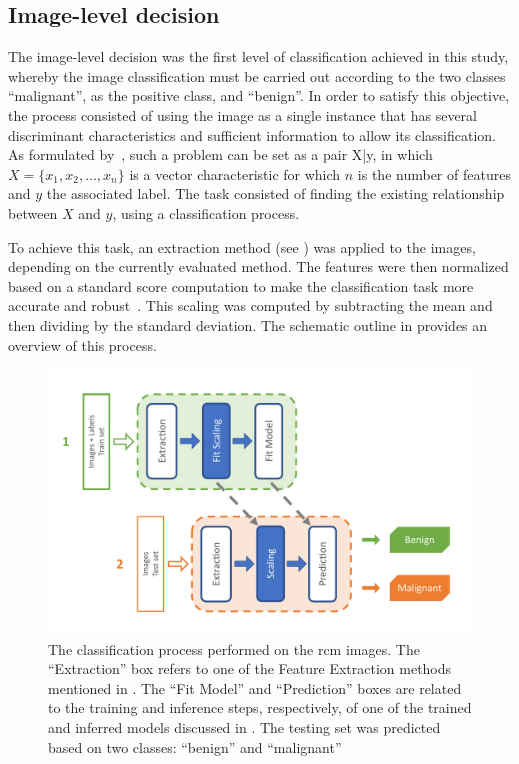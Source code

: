 \documentclass[journal,article,submit,moreauthors,pdftex, applsci]{Definitions/mdpi}
\begin{document}
\subsection{Image-level decision}
\label{sec:image_decision}
The image-level decision was the first level of classification achieved in this study, whereby the image classification must be carried out according to the two classes “malignant”, as the positive class, and “benign”. In order to satisfy this objective, the process consisted of using the image as a single instance that has several discriminant characteristics and sufficient information to allow its classification. As formulated by~\cite{foulds_frank_2010}, such a problem can be set as a pair {X|y}, in which \(X=\{x_1,x_2,\ldots,x_n\}\) is a vector characteristic for which \(n\) is the number of features and \(y\) the associated label. The task consisted of finding the existing relationship between \(X\) and \(y\), using a classification process.\par 
To achieve this task, an extraction method (see ) was applied to the images, depending on the currently evaluated method. The features were then normalized based on a standard score computation to make the classification task more accurate and robust~\cite{Graf2001}. This scaling was computed by subtracting the mean and then dividing by the standard deviation. The schematic outline in  provides an overview of this process.\par
\begin{figure}[h]
    \begin{center}
        \includegraphics[width=0.8\linewidth]{Figures/Process_Image.pdf}
        \caption{The classification process performed on the \ac{rcm} images. The “Extraction” box refers to one of the Feature Extraction methods mentioned in . The “Fit Model” and “Prediction” boxes are related to the training and inference steps, respectively, of one of the trained and inferred models discussed in . The testing set was predicted based on two classes: “benign” and “malignant”}
        \label{fig:image_process}
    \end{center} 
\end{figure}\par
\end{document}
